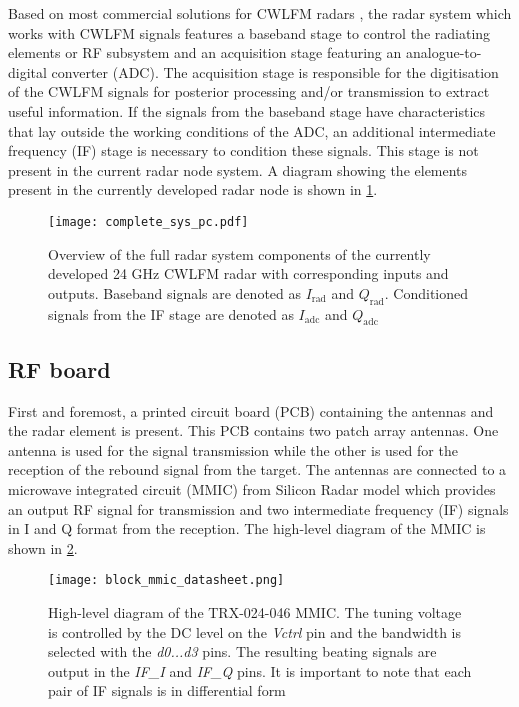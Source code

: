 Based on most commercial solutions for CWLFM radars \cite{Peng2019}, the radar system which works with CWLFM signals features a baseband stage to control the radiating elements or RF subsystem and an acquisition stage featuring an analogue-to-digital converter (ADC). The acquisition stage is responsible for the digitisation of the CWLFM signals for posterior processing and/or transmission to extract useful information. If the signals from the baseband stage have characteristics that lay outside the working conditions of the ADC, an additional intermediate frequency (IF) stage is necessary to condition these signals. This stage is not present in the current radar node system. A diagram showing the elements present in the currently developed radar node is shown in \cref{fig:current_system}.

\begin{figure}[ht]
	\centering
	\texttt{[image: complete\_sys\_pc.pdf]}
	\caption{Overview of the full radar system components of the currently developed 24 GHz CWLFM radar with corresponding inputs and outputs. Baseband signals are denoted as $I_{\mathrm{rad}}$ and $Q_{\mathrm{rad}}$. Conditioned signals from the IF stage are denoted as $I_{\mathrm{adc}}$ and $Q_{\mathrm{adc}}$ \label{fig:current_system}} %
\end{figure}

\subsection{RF board} \label{sec:rf_board_general}

First and foremost, a printed circuit board (PCB) containing the antennas and the radar element is present. This PCB contains two patch array antennas. One antenna is used for the signal transmission while the other is used for the reception of the rebound signal from the target. The antennas are connected to a microwave integrated circuit (MMIC) from Silicon Radar model \cite{SR2021} which provides an output RF signal for transmission and two intermediate frequency (IF) signals in I and Q format from the reception. The high-level diagram of the MMIC is shown in \cref{fig:block_mmic_general}.

\begin{figure}[ht]
	\centering
	\texttt{[image: block\_mmic\_datasheet.png]}
	\caption{High-level diagram of the TRX-024-046 MMIC. The tuning voltage is controlled by the DC level on the \textit{Vctrl} pin and the bandwidth is selected with the \textit{d0...d3} pins. The resulting beating signals are output in the \textit{IF\_I} and \textit{IF\_Q} pins. It is important to note that each pair of IF signals is in differential form \label{fig:block_mmic_general}}
\end{figure}

